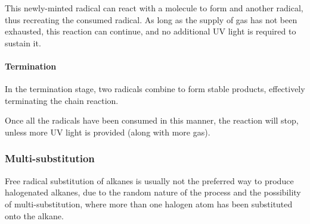 					This newly-minted  radical can react with a  molecule to form  and another
					\ch{\Cl} radical, thus recreating the consumed radical. As long as the supply of  gas has
					not been exhausted, this reaction can continue, and no additional UV light is required to sustain it.


				\pagebreak
				\paragraph{\hspace{5mm} Termination}

					In the termination stage, two radicals combine to form stable products, effectively terminating the chain reaction.


					Once all the radicals have been consumed in this manner, the reaction will stop, unless more UV light is provided (along
					with more  gas).




			\subsubsection{Multi-substitution}

				Free radical substitution of alkanes is usually not the preferred way to produce
				halogenated alkanes, due to the random nature of the process and the possibility of multi-substitution,
				where more than one halogen atom has been substituted onto the alkane.


